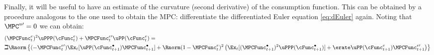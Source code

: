 \documentclass{\handout}
\begin{document}
Finally, it will be useful to have an estimate of the curvature (second derivative) of the consumption function.  This can be obtained by a procedure analogous to the one used to obtain the MPC: differentiate the differentiated Euler equation \eqref{eq:dEuler} again.  Noting that $\MPC^{u\prime}=0$ we can obtain:
\begin{equation}\begin{gathered}\begin{aligned}
\lefteqn{  (\MPCFunc^{e}_{t})^{2} \uPPP(\cFunc^{e}_{t}) +\MPCFunc_{t}^{e\prime}\uPP(\cFunc^{e}_{t}) = } &   \nonumber \\ 
&  \beth \Rnorm \left\{(-\MPCFunc_{t}^{e\prime}) \Ex_{t}[\uPP(\cFunc^{\bullet}_{t+1})\MPCFunc^{\bullet}_{t+1}]
+  \Rnorm (1-\MPCFunc^{e}_{t})^{2}\left(\Ex_{t}[(\MPCFunc_{t+1}^{\bullet})^{2}\uPPP(\cFunc^{\bullet}_{t+1})]+\erate  \uPP(\cFunc^{e}_{t+1})\MPCFunc_{t+1}^{e\prime}\right)\right\} \nonumber \\ \label{eq:kappaPExpr}
\end{aligned}\end{gathered}\end{equation}
\end{document}
